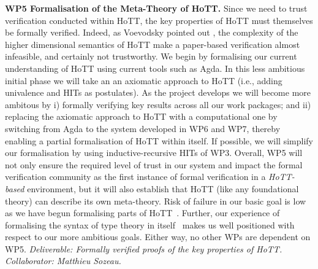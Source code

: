 \documentclass[a4paper,11pt]{article}
\newcommand{\eg}{{e.g.}\ }
\begin{document}
{\bf WP5 Formalisation of the Meta-Theory of HoTT.}  Since we need to
trust verification conducted within HoTT, the key properties of HoTT
must themselves be formally verified. Indeed, as Voevodsky pointed out
\cite{voevodsky-ias14}, the complexity of the higher dimensional
semantics of HoTT make a paper-based verification almost infeasible,
and certainly not trustworthy. We begin by formalising our current
understanding of HoTT using current tools such as Agda. In this less
ambitious initial phase we will take an an axiomatic approach to HoTT
(i.e., adding univalence and HITs as postulates). As the project
develops we will become more ambitous by i) formally verifying key
results across all our work packages; and ii) replacing the axiomatic
approach to HoTT with a computational one by switching from Agda to
the system developed in WP6 and WP7, thereby enabling a partial
formalisation of HoTT within itself. If possible, we will simplify our
formalisation by using inductive-recursive HITs of WP3.
Overall, WP5 will not only ensure the required level of trust in our
system and impact the formal verification community as the first
instance of formal verification in a {\em HoTT-based} environment, but
it will also establish that HoTT (like any foundational theory) can
describe its own meta-theory. Risk of failure in our basic goal is low
as we have begun formalising parts of HoTT~\cite{alti:csl12,AltenkirchLiRypacek14}. Further, our
experience of formalising the syntax of type theory in itself~\cite{mcbride:outrageous,ghani:fibredIR,alti:catind2} makes us well
positioned with respect to our more ambitious goals. Either way, no other WPs are
dependent on WP5. {\em Deliverable: Formally verified proofs of the
key properties of HoTT.  Collaborator: Matthieu Sozeau.  }


\end{document}
